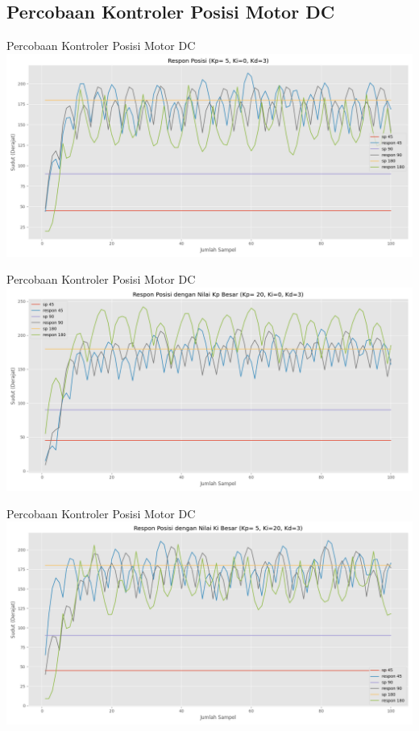 \documentclass[10pt,xcolor={dvipsnames}]{beamer}
\begin{document}
\subsection*{Percobaan Kontroler Posisi Motor DC}
\begin{frame}{Percobaan Kontroler Posisi Motor DC}
	\centering
	\includegraphics[width=14cm]{Graph/pos.png}
\end{frame}
\begin{frame}{Percobaan Kontroler Posisi Motor DC}
	\centering
	\includegraphics[width=14cm]{Graph/posKpBesar.png}
\end{frame}
\begin{frame}{Percobaan Kontroler Posisi Motor DC}
	\centering
	\includegraphics[width=14cm]{Graph/posKiBesar.png}
\end{frame}
\end{document}
